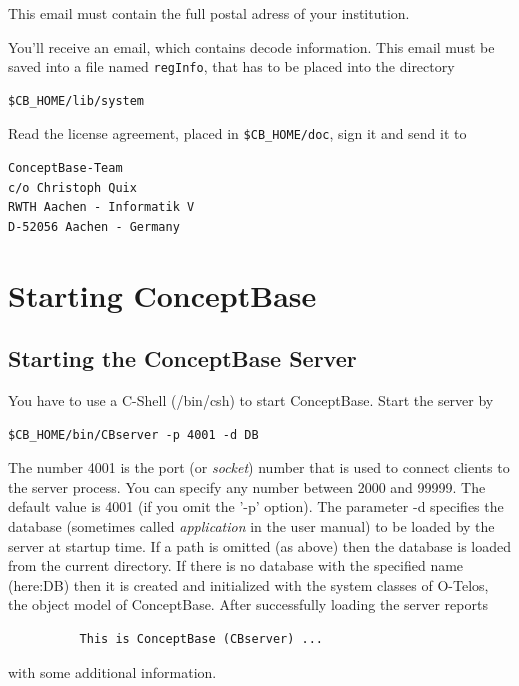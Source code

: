 This email must contain the full postal adress of your institution.

You'll receive an email, which contains decode information.
This email must be saved into a file named \verb+regInfo+, that has to
be placed into the directory

\begin{verbatim}
$CB_HOME/lib/system
\end{verbatim}

Read the license agreement, placed in
\verb+$CB_HOME/doc+, sign it and send it to

\begin{verbatim}
ConceptBase-Team
c/o Christoph Quix
RWTH Aachen - Informatik V
D-52056 Aachen - Germany
\end{verbatim}



\section{Starting ConceptBase}

\subsection{Starting the ConceptBase Server}

You have to use a C-Shell (/bin/csh) to start ConceptBase. Start the server by

\begin{verbatim}
$CB_HOME/bin/CBserver -p 4001 -d DB
\end{verbatim}

The number 4001 is the port (or {\em socket}) number that is used to connect
 clients to the server process. You can specify any number between 2000 and
99999. The default value is 4001 (if you omit the '-p' option). The parameter
-d specifies the database (sometimes called {\em application} in the user manual)
to be loaded by the server at startup time. If a path is omitted (as above)
then the database is loaded from the current directory. If there is no
database with the specified name (here:DB) then it is created and initialized
with the system classes of O-Telos, the object model of ConceptBase.
After successfully loading the server reports

\begin{verbatim}
          This is ConceptBase (CBserver) ...
\end{verbatim}

with some additional information.

